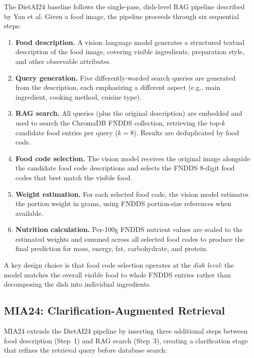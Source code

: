 \documentclass[11pt]{article}
\begin{document}
The DietAI24 baseline follows the single-pass, dish-level RAG pipeline described by Yan et al.\cite{yan2025dietai24}
Given a food image, the pipeline proceeds through six sequential steps:

\begin{enumerate}[nosep]
    \item \textbf{Food description.} A vision--language model generates a structured textual description of the food image, covering visible ingredients, preparation style, and other observable attributes.
    \item \textbf{Query generation.} Five differently-worded search queries are generated from the description, each emphasizing a different aspect (e.g., main ingredient, cooking method, cuisine type).
    \item \textbf{RAG search.} All queries (plus the original description) are embedded and used to search the ChromaDB FNDDS collection, retrieving the top-$k$ candidate food entries per query ($k{=}8$). Results are deduplicated by food code.
    \item \textbf{Food code selection.} The vision model receives the original image alongside the candidate food code descriptions and selects the FNDDS 8-digit food codes that best match the visible food.
    \item \textbf{Weight estimation.} For each selected food code, the vision model estimates the portion weight in grams, using FNDDS portion-size references when available.
    \item \textbf{Nutrition calculation.} Per-100g FNDDS nutrient values are scaled to the estimated weights and summed across all selected food codes to produce the final prediction for mass, energy, fat, carbohydrate, and protein.
\end{enumerate}

A key design choice is that food code selection operates at the \emph{dish level}: the model matches the overall visible food to whole FNDDS entries rather than decomposing the dish into individual ingredients.

\subsection{MIA24: Clarification-Augmented Retrieval}
\label{sec:mia24}

MIA24 extends the DietAI24 pipeline by inserting three additional steps between food description (Step~1) and RAG search (Step~3), creating a clarification stage that refines the retrieval query before database search:
\end{document}
